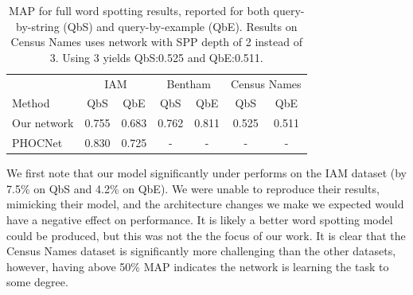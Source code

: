 \documentclass[ms,electronic,twosidetoc,letterpaper,chaptercenter,parttop,lol,lof,lot]{byumsphd}
\begin{document}
\begin{table}
\centering
\begin{tabular}{| l | c  c | c c | c c |}
  \hline
   & \multicolumn{2}{c|}{IAM} & \multicolumn{2}{c|}{Bentham} & \multicolumn{2}{c|}{Census Names}\\
  Method & QbS & QbE & QbS & QbE & QbS & QbE\\
  \hline			
  Our network & 0.755 & 0.683 & 0.762 & 0.811 & 0.525 & 0.511  %
  \\
  PHOCNet\cite{sudholt2016} & 0.830 & 0.725 & - & - & - & - \\
  \hline  
\end{tabular}
\caption{MAP for full word spotting results, reported for both query-by-string (QbS) and query-by-example (QbE). Results on Census Names uses network with SPP depth of 2 instead of 3. Using 3 yields QbS:0.525 and QbE:0.511.}
\label{tab:wordspottingresults}
\end{table}



We first note that our model significantly under performs \cite{sudholt2016} on the IAM dataset (by 7.5\% on QbS and 4.2\% on QbE). We were unable to reproduce their results, mimicking their model, and the architecture changes we make we expected would have a negative effect on performance. It is likely a better word spotting model could be produced, but this was not the the focus of our work.
It is clear that the Census Names dataset is significantly more challenging than the other datasets, however, having above 50\% MAP indicates the network is learning the task to some degree.
\end{document}
